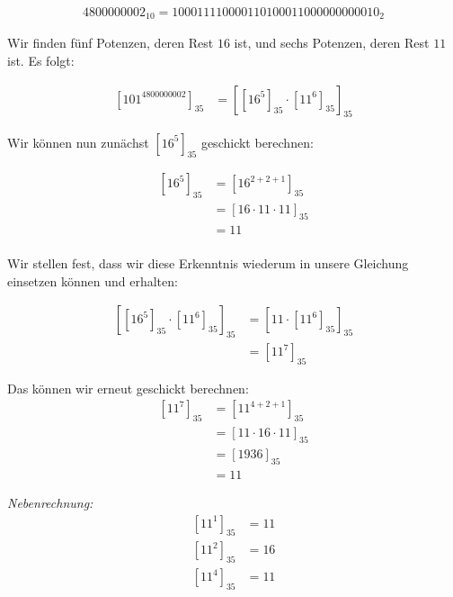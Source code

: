 \documentclass{../crypto}
\begin{document}
\begin{align*}4800000002_{10} = 100011110000110100011000000000010_2\end{align*}

Wir finden fünf Potenzen, deren Rest $16$ ist, und sechs Potenzen, deren Rest $11$ 
ist. Es folgt:

\begin{align*}
  \left[101^{4800000002}\right]_{35} &= \left[ \left[16^5\right]_{35} 
                                         \cdot \left[11^6\right]_{35}
                                        \right]_{35}
\end{align*}

Wir können nun zunächst $\left[16^5\right]_{35}$ geschickt berechnen:

\begin{align*}
  \left[16^5\right]_{35} &= \left[16^{2+2+1}\right]_{35} \\
                         &= \left[16 \cdot 11 \cdot 11\right]_{35} \\
                         &= 11 \\
\end{align*}

Wir stellen fest, dass wir diese Erkenntnis wiederum in unsere Gleichung 
einsetzen können und erhalten:

\begin{align*}
  \left[ \left[16^5\right]_{35} \cdot \left[11^6\right]_{35} \right]_{35} 
                    &= \left[11 \cdot \left[11^6\right]_{35} \right]_{35} \\
                    &= \left[11^7\right]_{35}
\end{align*}

Das können wir erneut geschickt berechnen:
\begin{align*}
  \left[11^{7}\right]_{35} &= \left[11^{4+2+1}\right]_{35} \\
                           &= \left[11 \cdot 16 \cdot 11\right]_{35} \\
                           &= \left[1936\right]_{35} \\
                           &= 11
\end{align*}
  
\emph{Nebenrechnung:}
\begin{align*}
  \left[11^{1}\right]_{35} &= 11 \\
  \left[11^{2}\right]_{35} &= 16 \\
  \left[11^{4}\right]_{35} &= 11
\end{align*}
\end{document}
